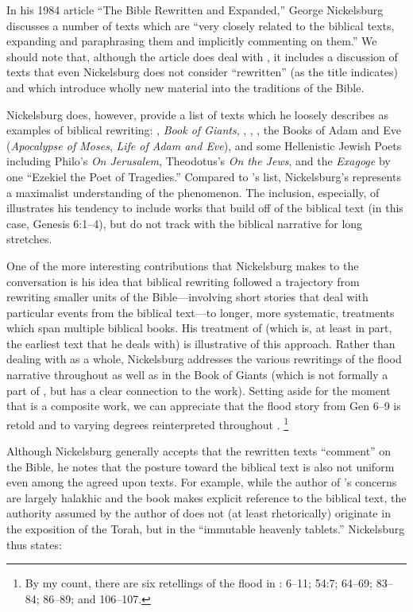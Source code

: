 In his 1984 article ``The Bible Rewritten and Expanded,'' George Nickelsburg discusses a number of texts which are ``very closely related to the biblical texts, expanding and paraphrasing them and implicitly commenting on them.''%
    \autocite[89]{nickelsburg_stone1984}
We should note that, although the article does deal with \rwb, it includes a discussion of texts that even Nickelsburg does not consider ``rewritten'' (as the title indicates) and which introduce wholly new material into the traditions of the Bible.%
    \autocite[89--90]{nickelsburg_stone1984}

Nickelsburg does, however, provide a list of texts which he loosely describes as examples of biblical rewriting: \firstenoch, \emph{Book of Giants}, \jub, \ga, \ant, the Books of Adam and Eve (\emph{Apocalypse of Moses}, \emph{Life of Adam and Eve}), and some Hellenistic Jewish Poets including Philo's \emph{On Jerusalem}, Theodotus's \emph{On the Jews}, and the \emph{Exagoge} by one ``Ezekiel the Poet of Tragedies.'' Compared to \vermes's list, Nickelsburg's represents a maximalist understanding of the \rwb phenomenon. The inclusion, especially, of \firstenoch illustrates his tendency to include works that build off of the biblical text (in this case, Genesis 6:1--4), but do not track with the biblical narrative for long stretches. 

One of the more interesting contributions that Nickelsburg makes to the conversation is his idea that biblical rewriting followed a trajectory from rewriting smaller units of the Bible---involving short stories that deal with particular events from the biblical text---to longer, more systematic, treatments which span multiple biblical books. His treatment of \firstenoch (which is, at least in part, the earliest text that he deals with) is illustrative of this approach. Rather than dealing with \firstenoch as a whole, Nickelsburg addresses the various rewritings of the flood narrative throughout \firstenoch as well as in the Book of Giants (which is not formally a part of \firstenoch, but has a clear connection to the work).%
    \autocite[90--97]{nickelsburg_stone1984}
Setting aside for the moment that \firstenoch is a composite work, we can appreciate that the flood story from Gen 6--9 is retold and to varying degrees reinterpreted throughout \firstenoch.%
    \footnote{%
        By my count, there   are six retellings of the flood in \firstenoch: 6--11; 54:7; 64--69;   83--84; 86--89; and 106--107.} 

Although Nickelsburg generally accepts that the rewritten texts ``comment'' on the Bible, he notes that the posture toward the biblical text is also not uniform even among the agreed upon \rwb texts. For example, while the author of \jub's concerns are largely halakhic and the book makes explicit reference to the biblical text, the authority assumed by the author of \jub does not (at least rhetorically) originate in the exposition of the Torah, but in the ``immutable heavenly tablets.''%
    \autocite[100--101]{nickelsburg_stone1984}
Nickelsburg thus states: 

